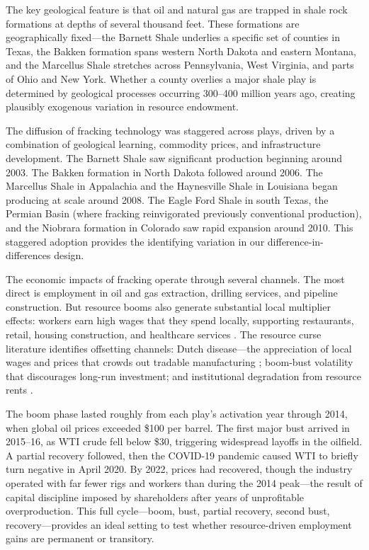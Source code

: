 \documentclass[12pt]{article}
\begin{document}
The key geological feature is that oil and natural gas are trapped in shale rock formations at depths of several thousand feet. These formations are geographically fixed---the Barnett Shale underlies a specific set of counties in Texas, the Bakken formation spans western North Dakota and eastern Montana, and the Marcellus Shale stretches across Pennsylvania, West Virginia, and parts of Ohio and New York. Whether a county overlies a major shale play is determined by geological processes occurring 300--400 million years ago, creating plausibly exogenous variation in resource endowment.

The diffusion of fracking technology was staggered across plays, driven by a combination of geological learning, commodity prices, and infrastructure development. The Barnett Shale saw significant production beginning around 2003. The Bakken formation in North Dakota followed around 2006. The Marcellus Shale in Appalachia and the Haynesville Shale in Louisiana began producing at scale around 2008. The Eagle Ford Shale in south Texas, the Permian Basin (where fracking reinvigorated previously conventional production), and the Niobrara formation in Colorado saw rapid expansion around 2010. This staggered adoption provides the identifying variation in our difference-in-differences design.

The economic impacts of fracking operate through several channels. The most direct is employment in oil and gas extraction, drilling services, and pipeline construction. But resource booms also generate substantial local multiplier effects: workers earn high wages that they spend locally, supporting restaurants, retail, housing construction, and healthcare services \citep{feyrer2017geographic, moretti2010local}. The resource curse literature identifies offsetting channels: Dutch disease---the appreciation of local wages and prices that crowds out tradable manufacturing \citep{allcott2018dutch}; boom-bust volatility that discourages long-run investment; and institutional degradation from resource rents \citep{cust2015resource}.

The boom phase lasted roughly from each play's activation year through 2014, when global oil prices exceeded \$100 per barrel. The first major bust arrived in 2015--16, as WTI crude fell below \$30, triggering widespread layoffs in the oilfield. A partial recovery followed, then the COVID-19 pandemic caused WTI to briefly turn negative in April 2020. By 2022, prices had recovered, though the industry operated with far fewer rigs and workers than during the 2014 peak---the result of capital discipline imposed by shareholders after years of unprofitable overproduction. This full cycle---boom, bust, partial recovery, second bust, recovery---provides an ideal setting to test whether resource-driven employment gains are permanent or transitory.
\end{document}
